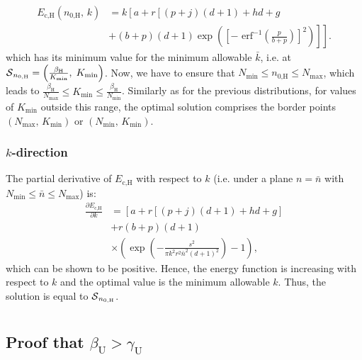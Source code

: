 \documentclass[twocolumn,english]{IEEEtran}
\theoremstyle{plain}
\theoremstyle{definition}
\begin{document}
\begin{align}
E_{\text{c,H}}(n_{\text{0,H}},\, k) & =k\left[a+r\left[\left(p+j\right)\left(d+1\right)+hd+g\right.\right.\nonumber \\
 & +\left.\left.\left(b+p\right)\left(d+1\right)\exp\left(\left[-\text{ erf}^{-1}\left(\frac{p}{b+p}\right)\right]^{2}\right)\right]\right].
\end{align}
which has its minimum value for the minimum allowable $\bar{k}$,
i.e. at $\text{\ensuremath{\mathcal{S}}}_{n_{0,\text{H}}}=\left(\frac{\beta_{\text{H}}}{K_{\text{min}}},\; K_{\text{min}}\right)$.
Now, we have to ensure that $N_{\text{min}}\le n_{\text{0,H}}\le N_{\text{max}}$,
which leads to $\frac{\beta_{\text{H}}}{N_{\text{max}}}\le K_{\text{min}}\le\frac{\beta_{\text{H}}}{N_{\text{min}}}$.
Similarly as for the previous distributions, for values of $K_{\text{min}}$
outside this range, the optimal solution comprises the border points
$\left(N_{\text{max}},\, K_{\text{min}}\right)$ or $\left(N_{\text{min}},\, K_{\text{min}}\right)$.


\subsubsection{$k$-direction}

The partial derivative of $E_{\text{c,H}}$ with respect to $k$ (i.e.
under a plane $n=\bar{n}$ with $N_{\min}\leq\bar{n}\leq N_{\max}$)
is: 
\begin{align}
\frac{\partial E_{\text{c,H}}}{\partial k} & =\left[a+r\left[\left(p+j\right)\left(d+1\right)+hd+g\right]\right.\nonumber \\
 & +r\left(b+p\right)(d+1)\\
 & \times\left(\exp\left(-\frac{s^{2}}{\pi k^{2}r^{2}\bar{n}^{2}(d+1)^{2}}\right)-1\right),\nonumber 
\end{align}
which can be shown to be positive. Hence, the energy function is increasing
with respect to $k$ and the optimal value is the minimum allowable
$k$. Thus, the solution is equal to $\text{\ensuremath{\mathcal{S}}}_{n_{0,\text{H}}}$.


\section{\label{sec:Appendix-II}}


\subsection{Proof that $\beta_{\text{U}}>\gamma_{\textrm{U}}$}
\end{document}
